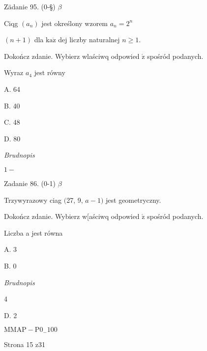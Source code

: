 \documentclass[a4paper,12pt]{article}
\begin{document}
Zädanie 95. (0-\S) $\beta$

Ciqg $(a_{n})$ jest określony wzorem $a_{n}=2^{n}$

$(n+1)$ dla $\mathrm{k}\mathrm{a}\dot{\mathrm{z}}$ dej liczby naturalnej $n\geq 1.$

Dokończ zdanie. Wybierz wlaściwq odpowied $\acute{\mathrm{z}}$ spośród podanych.

Wyraz $a_{4}$ jest równy

A. 64

B. 40

C. 48

D. 80

{\it Brudnopis}

$1 -$

Zadanie 86. (0-1) $\beta$

Trzywyrazowy ciag $($27, 9, $a-1)$ jest geometryczny.

Dokończ zdanie. Wybierz w[aściwq odpowied $\acute{\mathrm{z}}$ spośród podanych.

Liczba a jest równa

A. 3

B. 0

{\it Brudnopis}

4

D. 2

$\mathrm{M}\mathrm{M}\mathrm{A}\mathrm{P}-\mathrm{P}0_{-}100$

Strona 15 z31
\end{document}
